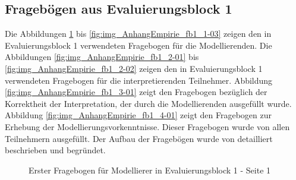 \subsection{Fragebögen aus Evaluierungsblock 1}
\label{sub:fb_eval1}

Die Abbildungen \ref{fig:img_AnhangEmpirie_fb1_1-01} bis \ref{fig:img_AnhangEmpirie_fb1_1-03} zeigen den in Evaluierungsblock 1 verwendeten Fragebogen für die Modellierenden. Die Abbildungen \ref{fig:img_AnhangEmpirie_fb1_2-01} bis \ref{fig:img_AnhangEmpirie_fb1_2-02} zeigen den in Evaluierungsblock 1 verwendeten Fragebogen für die interpretierenden Teilnehmer. Abbildung \ref{fig:img_AnhangEmpirie_fb1_3-01} zeigt den Fragebogen bezüglich der Korrektheit der Interpretation, der durch die Modellierenden ausgefüllt wurde. Abbildung \ref{fig:img_AnhangEmpirie_fb1_4-01} zeigt den Fragebogen zur Erhebung der Modellierungsvorkenntnisse. Dieser Fragebogen wurde von allen Teilnehmern ausgefüllt. Der Aufbau der Fragebögen wurde von \cite{Bohninger10} detailliert beschrieben und begründet.

\begin{figure}[htbp]
	\centering
	\caption{Erster Fragebogen für Modellierer in Evaluierungsblock 1 - Seite 1}
	\label{fig:img_AnhangEmpirie_fb1_1-01}
\end{figure}

